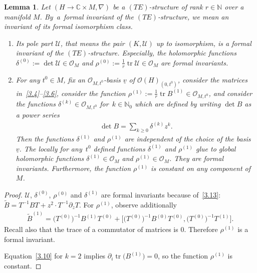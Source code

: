 \documentclass[pdftex]{sigma}%
\numberwithin{equation}{section}
\numberwithin{figure}{section}
\newcommand{\N}{{\mathbb N}}
\newcommand{\C}{{\mathbb C}}
\newcommand{\OO}{{\mathcal O}}
\newcommand{\UU}{{\mathcal U}}
\newcommand{\www}{\widetilde}
\newcommand{\uuuu}{\underline}
\newcommand{\paa}{\partial}
\newcommand{\nnn}{\nabla}
\DeclareMathOperator{\tr}{tr}
\newtheorem{Lemma}[Theorem]{Lemma}
\begin{document}
\begin{Lemma}\label{t3.9}
Let $(H\to\C\times M,\nnn)$ be a $(TE)$-structure
of rank $r\in\N$ over a manifold $M$.
By~a~for\-mal invariant of the $(TE)$-structure,
we mean an invariant of its formal isomorphism class.

\begin{enumerate}\itemsep=0pt
\item[$(a)$] Its pole part $\UU$, that means the pair $(K,\UU)$
up to isomorphism, is a formal invariant of the
$(TE)$-structure. Especially, the holomorphic functions
$\delta^{(0)}:=\det\UU\in\OO_M$ and
$\rho^{(0)}:=\frac{1}{r}\tr\UU\allowbreak\in\OO_M$ are formal invariants.

\item[$(b)$] For any $t^0\in M$, fix an $\OO_{M,t^0}$-basis $\uuuu{v}$
of $\OO(H)_{(0,t^0)}$,
consider the matrices in~\eqref{3.4}--\eqref{3.6},
consider the function $\rho^{(1)}:=\frac{1}{r}\tr B^{(1)}\in\OO_{M,t^0}$,
and consider the functions
$\delta^{(k)}\in\OO_{M,t^0}$ for~$k\in\N_0$
which are defined by writing $\det B$ as a power series
\begin{gather*}%
\det B=\sum_{k\geq 0}\delta^{(k)}z^k.
\end{gather*}
Then the functions $\delta^{(1)}$ and $\rho^{(1)}$ are
independent of the choice of the basis $\uuuu{v}$.
The locally for any~$t^0$ defined functions $\delta^{(1)}$ and
$\rho^{(1)}$ glue to global holomorphic functions
$\delta^{(1)}\in\OO_M$ and $\rho^{(1)}\in\OO_M$.
They are formal invariants.
Furthermore, the function $\rho^{(1)}$ is constant
on any component of $M$.
\end{enumerate}
\end{Lemma}

\begin{proof} $\UU$, $\delta^{(0)}$, $\rho^{(0)}$ and $\delta^{(1)}$
are formal invariants because of~\eqref{3.13}:
$\www B = T^{-1}BT+z^2 \cdot T^{-1}\paa_z T.$
For $\rho^{(1)}$, observe additionally
\begin{gather*}
{\www B}^{(1)}= \big(T^{(0)}\big)^{-1}B^{(1)}T^{(0)}
+ \big[\big(T^{(0)}\big)^{-1}B^{(0)}T^{(0)}, \big(T^{(0)}\big)^{-1}T^{(1)}\big].
\end{gather*}
Recall also that the trace of a commutator of matrices is 0.
Therefore $\rho^{(1)}$ is a formal invariant.

Equation~\eqref{3.10} for $k=2$ implies
$\paa_i\tr \big(B^{(1)}\big)=0$, so the function $\rho^{(1)}$ is constant.
\end{proof}
\end{document}
